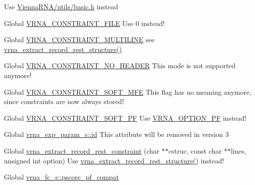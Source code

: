 \begin{DoxyRefList}
\label{deprecated__deprecated000121}%
%
Use \mbox{\hyperlink{utils_2basic_8h}{Vienna\+RNA/utils/basic.\+h}} instead  
\item[Global \mbox{\hyperlink{group__constraints_ga62e0ed0c33002c09423de4e646f85a2b}{VRNA\+\_\+\+CONSTRAINT\+\_\+\+FILE}} ]\label{deprecated__deprecated000156}%
%
Use 0 instead!  
\item[Global \mbox{\hyperlink{group__file__formats_ga7d725ef525b29891abef3f1ed42599a4}{VRNA\+\_\+\+CONSTRAINT\+\_\+\+MULTILINE}} ]\label{deprecated__deprecated000163}%
%
see \mbox{\hyperlink{group__file__formats_gad37cbb63a05eed63ba25c91628409be0}{vrna\+\_\+extract\+\_\+record\+\_\+rest\+\_\+structure()}}  
\item[Global \mbox{\hyperlink{hard_8h_a08d12a9a846ea593b7171d277c9f033f}{VRNA\+\_\+\+CONSTRAINT\+\_\+\+NO\+\_\+\+HEADER}} ]\label{deprecated__deprecated000159}%
%
This mode is not supported anymore! 
\item[Global \mbox{\hyperlink{group__constraints_ga62aa195893d02d1a79ca94952748df36}{VRNA\+\_\+\+CONSTRAINT\+\_\+\+SOFT\+\_\+\+MFE}} ]\label{deprecated__deprecated000157}%
%
This flag has no meaning anymore, since constraints are now always stored!  
\item[Global \mbox{\hyperlink{group__constraints_ga03fb5000c19b9a2082bf4ea30a543045}{VRNA\+\_\+\+CONSTRAINT\+\_\+\+SOFT\+\_\+\+PF}} ]\label{deprecated__deprecated000158}%
%
Use \mbox{\hyperlink{group__fold__compound_gabfbadcddda3e74ce7f49035ef8f058f7}{VRNA\+\_\+\+OPTION\+\_\+\+PF}} instead!  
\item[Global \mbox{\hyperlink{group__energy__parameters_a378d5bcf2bae1f3ec84c912c7d3908d2}{vrna\+\_\+exp\+\_\+param\+\_\+s\+::id}} ]\label{deprecated__deprecated000151}%
%
This attribute will be removed in version 3  
\item[Global \mbox{\hyperlink{group__file__formats_ga55a9ae6dfeecc1b3f0c2acf6fa796c15}{vrna\+\_\+extract\+\_\+record\+\_\+rest\+\_\+constraint}} (char $\ast$$\ast$cstruc, const char $\ast$$\ast$lines, unsigned int option)]\label{deprecated__deprecated000164}%
%
Use \mbox{\hyperlink{group__file__formats_gad37cbb63a05eed63ba25c91628409be0}{vrna\+\_\+extract\+\_\+record\+\_\+rest\+\_\+structure()}} instead!  
\item[Global \mbox{\hyperlink{group__fold__compound_abf5e82d14649b6179ae60ed7da6e4fc0}{vrna\+\_\+fc\+\_\+s\+::pscore\+\_\+pf\+\_\+compat}} ]\label{deprecated__deprecated000080}%

\end{DoxyRefList}
